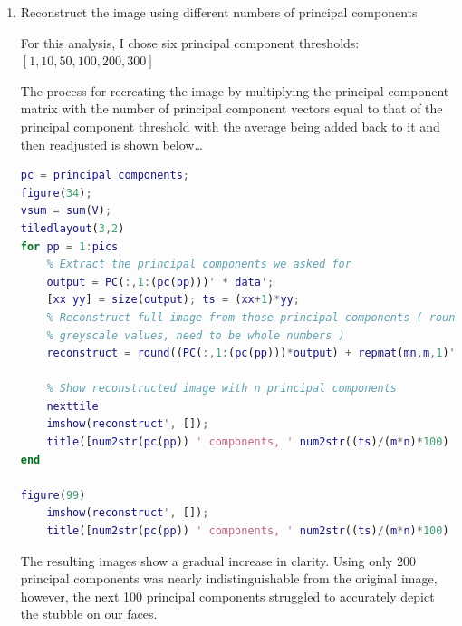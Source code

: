 \documentclass[12pt,letterpaper]{article}
\begin{document}
\begin{enumerate}
    \item Reconstruct the image using different numbers of principal components
    
    For this analysis, I chose six principal component thresholds: $[1, 10, 50, 100, 200, 300]$

    The process for recreating the image by multiplying the principal component matrix with the number of principal component vectors equal to that of the principal component threshold with the average being added back to it and then readjusted is shown below\ldots

\begin{lstlisting}[language = Matlab]
% Loop over different PC sizes and plot them
pc = principal_components; 
figure(34); 
vsum = sum(V);
tiledlayout(3,2)
for pp = 1:pics
    % Extract the principal components we asked for
    output = PC(:,1:(pc(pp)))' * data';
    [xx yy] = size(output); ts = (xx+1)*yy;
    % Reconstruct full image from those principal components ( round for
    % greyscale values, need to be whole numbers )
    reconstruct = round((PC(:,1:(pc(pp)))*output) + repmat(mn,m,1)');

    % Show reconstructed image with n principal components
    nexttile
    imshow(reconstruct', []);
    title([num2str(pc(pp)) ' components, ' num2str((ts)/(m*n)*100) '%  storage, ' num2str(sum(V(1:pc(pp))/vsum)*100) '% eigen']);
end

figure(99)
    imshow(reconstruct', []);
    title([num2str(pc(pp)) ' components, ' num2str((ts)/(m*n)*100) '%  storage, ' num2str(sum(V(1:pc(pp))/vsum)*100) '% eigen']);
\end{lstlisting}   

\newpage
    The resulting images show a gradual increase in clarity. Using only 200 principal components was nearly indistinguishable from the original image, however, the next 100 principal components struggled to accurately depict the stubble on our faces.


\end{enumerate}
\end{document}
